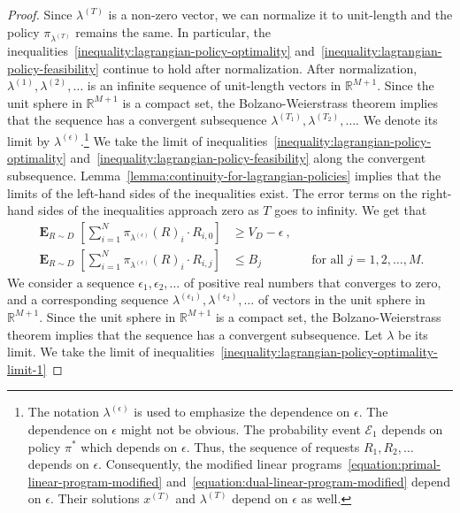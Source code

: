 \documentclass[12pt]{article}
\newcommand{\R}{\mathbb{R}}
\newcommand{\E}{\mathcal{E}}
\DeclareMathOperator*{\Exp}{\mathbf{E}}
\theoremstyle{definition}
\begin{document}
\begin{proof}
Since $\lambda^{(T)}$ is a non-zero vector, we can normalize it to unit-length
and the policy $\pi_{\lambda^{(T)}}$ remains the same. In particular, the
inequalities~\eqref{inequality:lagrangian-policy-optimality}
and~\eqref{inequality:lagrangian-policy-feasibility} continue to hold after
normalization. After normalization, $\lambda^{(1)}, \lambda^{(2)}, \dots$ is an
infinite sequence of unit-length vectors in $\R^{M+1}$. Since the unit sphere in
$\R^{M+1}$ is a compact set, the Bolzano-Weierstrass theorem implies that the
sequence has a convergent subsequence $\lambda^{(T_1)}, \lambda^{(T_2)}, \dots$.
We denote its limit by $\lambda^{(\epsilon)}$.\footnote{The notation
$\lambda^{(\epsilon)}$ is used to emphasize the dependence on $\epsilon$. The
dependence on $\epsilon$ might not be obvious. The probability event $\E_1$
depends on policy $\pi^*$ which depends on $\epsilon$. Thus, the sequence of
requests $R_1, R_2, \dots$ depends on $\epsilon$. Consequently, the modified
linear programs~\eqref{equation:primal-linear-program-modified}
and~\eqref{equation:dual-linear-program-modified} depend on $\epsilon$. Their
solutions $x^{(T)}$ and $\lambda^{(T)}$ depend on $\epsilon$ as well.} We take
the limit of inequalities~\eqref{inequality:lagrangian-policy-optimality}
and~\eqref{inequality:lagrangian-policy-feasibility} along the convergent
subsequence. Lemma~\ref{lemma:continuity-for-lagrangian-policies} implies that
the limits of the left-hand sides of the inequalities exist. The error terms on
the right-hand sides of the inequalities approach zero as $T$ goes to infinity.
We get that
\begin{align}
\label{inequality:lagrangian-policy-optimality-limit-1}
\Exp_{R \sim D} \left[ \sum_{i=1}^N \pi_{\lambda^{(\epsilon)}}(R)_i \cdot R_{i,0}  \right] & \ge V_D - \epsilon \: , \\
\label{inequality:lagrangian-policy-feasibility-limit-1}
\Exp_{R \sim D} \left[ \sum_{i=1}^N \pi_{\lambda^{(\epsilon)}}(R)_i \cdot R_{i,j}  \right] & \le B_j
&& \text{for all $j=1,2,\dots,M$.}
\end{align}
We consider a sequence $\epsilon_1, \epsilon_2, \dots$ of positive real numbers
that converges to zero, and a corresponding sequence $\lambda^{(\epsilon_1)},
\lambda^{(\epsilon_2)}, \dots$ of vectors in the unit sphere in $\R^{M+1}$.
Since the unit sphere in $\R^{M+1}$ is a compact set, the Bolzano-Weierstrass
theorem implies that the sequence has a convergent subsequence. Let $\lambda$ be
its limit. We take the limit of
inequalities~\eqref{inequality:lagrangian-policy-optimality-limit-1}

\end{proof}
\end{document}
